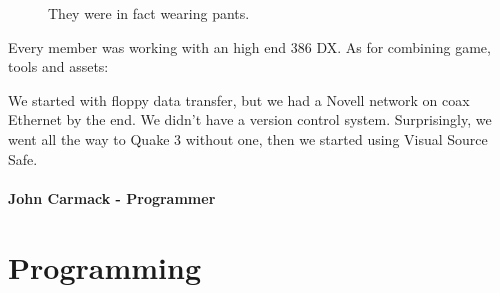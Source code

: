 \documentclass[book.tex]{subfiles}
\begin{document}
\begin{figure}[H]
\centering
\caption{They were in fact wearing pants.}
\label{fig:id_team_1993}
\end{figure}

Every member was working with an high end 386 DX. As for combining game, tools and assets:\\

 \begin{fancyquotes}
We started with floppy data transfer, but we had a Novell network on coax Ethernet by the end. We didn't have a version control system.  Surprisingly, we went all the way to Quake 3 without one, then we started using Visual Source Safe.\\
 \\
\textbf{John Carmack - Programmer}
\end{fancyquotes}
\section{Programming}
\end{document}
